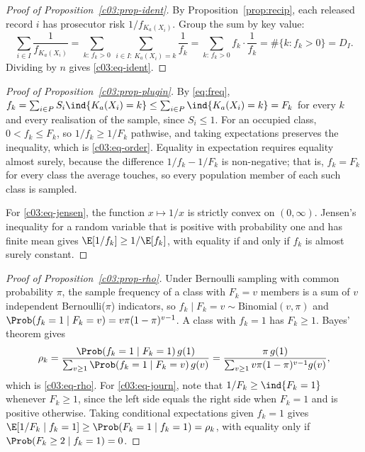\begin{proof}[Proof of Proposition~\ref{c03:prop-ident}]
By Proposition~\ref{prop:recip}, each released record $i$ has prosecutor risk
$1/f_{K_a(X_i)}$. Group the sum by key value:
\[
\sum_{i \in I}\frac{1}{f_{K_a(X_i)}}
= \sum_{k:\,f_k>0}\ \sum_{i \in I:\,K_a(X_i)=k}\frac{1}{f_k}
= \sum_{k:\,f_k>0} f_k\cdot\frac{1}{f_k}
= \#\{k : f_k > 0\} = D_I .
\]
Dividing by $n$ gives \eqref{c03:eq-ident}.
\end{proof}

\begin{proof}[Proof of Proposition~\ref{c03:prop-plugin}]
By \eqref{eq:freq}, $f_k = \sum_{i\in P} S_i\ind{K_a(X_i)=k} \le
\sum_{i \in P}\ind{K_a(X_i)=k} = F_k$ for every $k$ and every realisation of the
sample, since $S_i \le 1$. For an occupied class, $0 < f_k \le F_k$, so
$1/f_k \ge 1/F_k$ pathwise, and taking expectations preserves the inequality, which is
\eqref{c03:eq-order}. Equality in expectation requires equality almost surely, because
the difference $1/f_k - 1/F_k$ is non-negative; that is, $f_k = F_k$ for every class
the average touches, so every population member of each such class is sampled.

For \eqref{c03:eq-jensen}, the function $x \mapsto 1/x$ is strictly convex on
$(0,\infty)$. Jensen's inequality for a random variable that is positive with
probability one and has finite mean gives $\E[1/f_k] \ge 1/\E[f_k]$, with equality if
and only if $f_k$ is almost surely constant.
\end{proof}

\begin{proof}[Proof of Proposition~\ref{c03:prop-rho}]
Under Bernoulli sampling with common probability $\pi$, the sample frequency of a class
with $F_k = v$ members is a sum of $v$ independent Bernoulli($\pi$) indicators, so
$f_k \mid F_k = v \sim \mathrm{Binomial}(v,\pi)$ and
$\Prob(f_k = 1 \mid F_k = v) = v\pi(1-\pi)^{v-1}$. A class with $f_k = 1$ has
$F_k \ge 1$. Bayes' theorem gives
\[
\rho_k = \frac{\Prob(f_k = 1 \mid F_k = 1)\,g(1)}
{\sum_{v\ge1}\Prob(f_k=1\mid F_k=v)\,g(v)}
= \frac{\pi\,g(1)}{\sum_{v\ge1}v\pi(1-\pi)^{v-1}g(v)},
\]
which is \eqref{c03:eq-rho}. For \eqref{c03:eq-journ}, note that
$1/F_k \ge \ind{F_k = 1}$ whenever $F_k \ge 1$, since the left side equals the right
side when $F_k = 1$ and is positive otherwise. Taking conditional expectations given
$f_k = 1$ gives $\E[1/F_k \mid f_k = 1] \ge \Prob(F_k = 1 \mid f_k = 1) = \rho_k$, with
equality only if $\Prob(F_k \ge 2 \mid f_k = 1) = 0$.
\end{proof}

